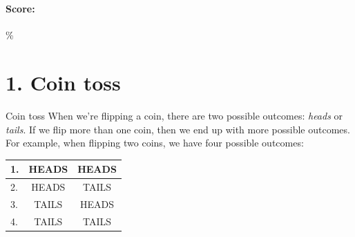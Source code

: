\documentclass[a4paper,12pt]{book}
\begin{document}
    ~\\

    \paragraph{Score:} \fitb \%
    
    \hrulefill{}
    
    \newpage{}


    \section*{1. Coin toss}

        \begin{intro}{Coin toss}
            When we're flipping a coin, there are two possible outcomes:
            \textit{heads} or \textit{tails}. If we flip more than one
            coin, then we end up with more possible outcomes. For example,
            when flipping two coins, we have four possible outcomes:

            \begin{center}
                \begin{tabular}{ | l | c | c | }
                    \hline
                    1. & HEADS & HEADS \\ \hline
                    2. & HEADS & TAILS \\ \hline
                    3. & TAILS & HEADS \\ \hline
                    4. & TAILS & TAILS \\ \hline
                \end{tabular}
            \end{center}
        \end{intro}
\end{document}
